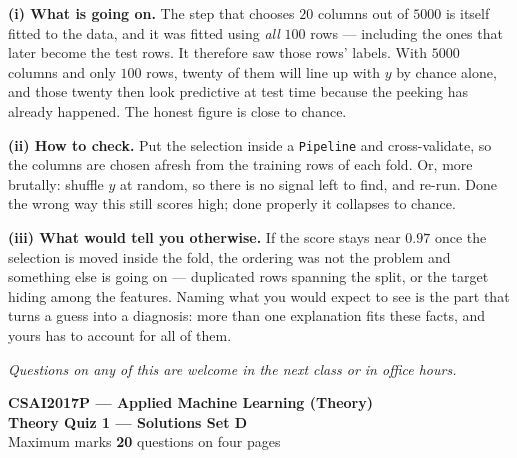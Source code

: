 \documentclass[10pt,a4paper]{article}
\newcommand{\SetLetter}{}
\begin{document}
\vspace{4pt}

\textbf{(i) What is going on.} The step that chooses $20$ columns out of $5000$ is itself fitted to the data, and it was fitted using \emph{all} $100$ rows --- including the ones that later become the test rows. It therefore saw those rows' labels. With $5000$ columns and only $100$ rows, twenty of them will line up with $y$ by chance alone, and those twenty then look predictive at test time because the peeking has already happened. The honest figure is close to chance.\par\vspace{1mm}\textbf{(ii) How to check.} Put the selection inside a \texttt{Pipeline} and cross-validate, so the columns are chosen afresh from the training rows of each fold. Or, more brutally: shuffle $y$ at random, so there is no signal left to find, and re-run. Done the wrong way this still scores high; done properly it collapses to chance.\par\vspace{1mm}\textbf{(iii) What would tell you otherwise.} If the score stays near $0.97$ once the selection is moved inside the fold, the ordering was not the problem and something else is going on --- duplicated rows spanning the split, or the target hiding among the features. Naming what you would expect to see is the part that turns a guess into a diagnosis: more than one explanation fits these facts, and yours has to account for all of them.

\vfill

{\footnotesize\itshape Questions on any of this are welcome in the next class or in office hours.}

\newpage


\renewcommand{\SetLetter}{D}\setcounter{page}{1}

\begin{center}
{\large\bfseries CSAI2017P --- Applied Machine Learning (Theory)}\\[2pt]
{\large\bfseries Theory Quiz 1 --- Solutions \quad\textbullet\quad Set D}\\[3pt]
{\small Maximum marks \textbf{20} \quad\textbullet{} questions on four pages}
\end{center}
\vspace{2pt}

\noindent{}
\vspace{3pt}
\end{document}
